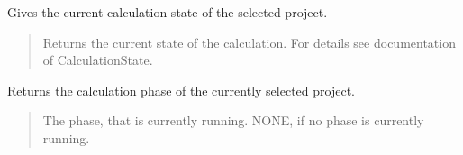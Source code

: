 \documentclass[letterpaper,10pt,english]{sphinxmanual}
\begin{document}
\begin{fulllineitems}
\begin{fulllineitems}
\label{\detokenize{apidoc/src.osm_configurator.control:src.osm_configurator.control.calculation_controller.CalculationController.get_calculation_state}}
\pysigstartsignatures
{}
\pysigstopsignatures
\sphinxAtStartPar
Gives the current calculation state of the selected project.
\begin{quote}\begin{description}
\sphinxAtStartPar
Returns the current state of the calculation. For details see documentation of CalculationState.

\sphinxAtStartPar
{\hyperref[\detokenize{apidoc/src.osm_configurator.model.project.calculation:src.osm_configurator.model.project.calculation.calculation_state_enum.CalculationState}]{}}

\end{description}\end{quote}

\end{fulllineitems}


\begin{fulllineitems}
\label{\detokenize{apidoc/src.osm_configurator.control:src.osm_configurator.control.calculation_controller.CalculationController.get_current_calculation_phase}}
\pysigstartsignatures
{}
\pysigstopsignatures
\sphinxAtStartPar
Returns the calculation phase of the currently selected project.
\begin{quote}\begin{description}
\sphinxAtStartPar
The phase, that is currently running. NONE, if no phase is currently running.

\sphinxAtStartPar
{\hyperref[\detokenize{apidoc/src.osm_configurator.model.project.calculation:src.osm_configurator.model.project.calculation.calculation_phase_enum.CalculationPhase}]{}}

\end{description}\end{quote}


\end{fulllineitems}
\end{fulllineitems}
\end{document}
